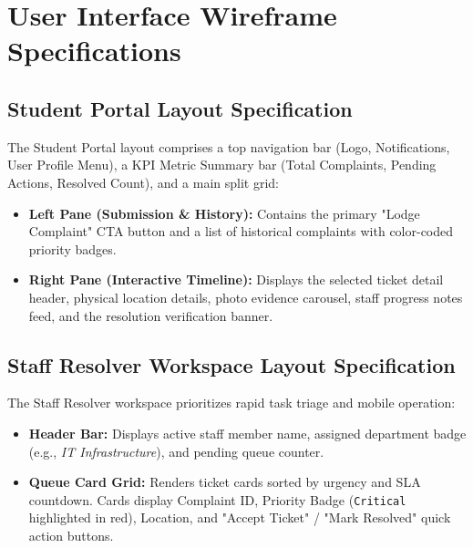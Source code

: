 \documentclass[12pt, a4paper]{article}
\begin{document}
\section{User Interface Wireframe Specifications}

\subsection{Student Portal Layout Specification}
The Student Portal layout comprises a top navigation bar (Logo, Notifications, User Profile Menu), a KPI Metric Summary bar (Total Complaints, Pending Actions, Resolved Count), and a main split grid:
\begin{itemize}[leftmargin=*]
    \item \textbf{Left Pane (Submission \& History):} Contains the primary "Lodge Complaint" CTA button and a list of historical complaints with color-coded priority badges.
    \item \textbf{Right Pane (Interactive Timeline):} Displays the selected ticket detail header, physical location details, photo evidence carousel, staff progress notes feed, and the resolution verification banner.
\end{itemize}

\subsection{Staff Resolver Workspace Layout Specification}
The Staff Resolver workspace prioritizes rapid task triage and mobile operation:
\begin{itemize}[leftmargin=*]
    \item \textbf{Header Bar:} Displays active staff member name, assigned department badge (e.g., \textit{IT Infrastructure}), and pending queue counter.
    \item \textbf{Queue Card Grid:} Renders ticket cards sorted by urgency and SLA countdown. Cards display Complaint ID, Priority Badge (\texttt{Critical} highlighted in red), Location, and "Accept Ticket" / "Mark Resolved" quick action buttons.
\end{itemize}
\end{document}
